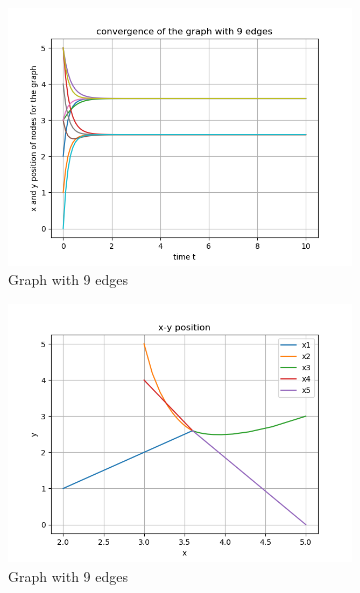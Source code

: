 \documentclass{article}
\begin{document}
\begin{problem}
\begin{figure}
\begin{subfigure}{0.4\textwidth}
            \includegraphics[width=\textwidth]{./img/p3_edge_9_1.png}
            \caption{Graph with 9 edges}
        \end{subfigure}
        \begin{subfigure}{0.4\textwidth}
            \includegraphics[width=\textwidth]{./img/p3_edge_9_2.png}
            \caption{Graph with 9 edges}
        \end{subfigure}
        \begin{subfigure}{0.4\textwidth}

\end{subfigure}
\end{figure}
\end{problem}
\end{document}
